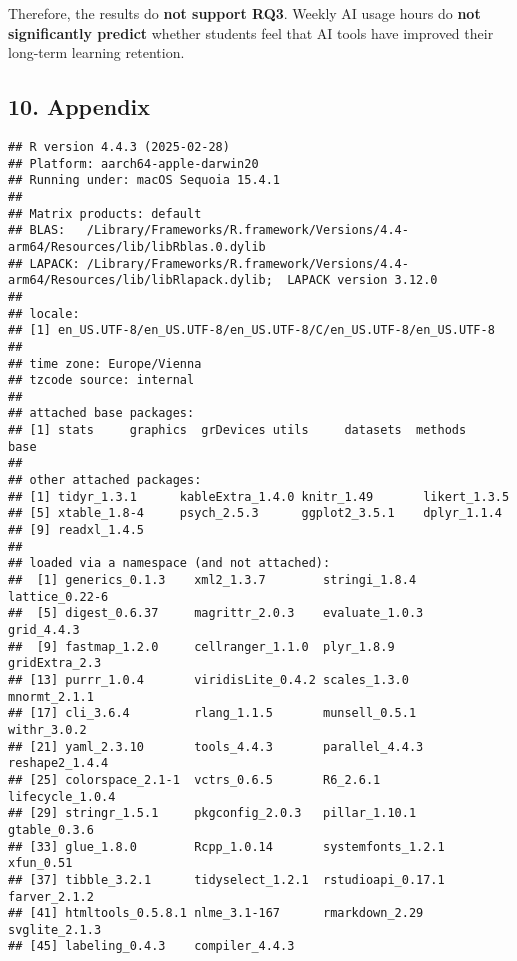 \documentclass[
]{article}
\begin{document}
Therefore, the results do \textbf{not support RQ3}. Weekly AI usage
hours do \textbf{not significantly predict} whether students feel that
AI tools have improved their long-term learning retention.

\subsection{10. Appendix}\label{appendix}

\begin{verbatim}
## R version 4.4.3 (2025-02-28)
## Platform: aarch64-apple-darwin20
## Running under: macOS Sequoia 15.4.1
## 
## Matrix products: default
## BLAS:   /Library/Frameworks/R.framework/Versions/4.4-arm64/Resources/lib/libRblas.0.dylib 
## LAPACK: /Library/Frameworks/R.framework/Versions/4.4-arm64/Resources/lib/libRlapack.dylib;  LAPACK version 3.12.0
## 
## locale:
## [1] en_US.UTF-8/en_US.UTF-8/en_US.UTF-8/C/en_US.UTF-8/en_US.UTF-8
## 
## time zone: Europe/Vienna
## tzcode source: internal
## 
## attached base packages:
## [1] stats     graphics  grDevices utils     datasets  methods   base     
## 
## other attached packages:
## [1] tidyr_1.3.1      kableExtra_1.4.0 knitr_1.49       likert_1.3.5    
## [5] xtable_1.8-4     psych_2.5.3      ggplot2_3.5.1    dplyr_1.1.4     
## [9] readxl_1.4.5    
## 
## loaded via a namespace (and not attached):
##  [1] generics_0.1.3    xml2_1.3.7        stringi_1.8.4     lattice_0.22-6   
##  [5] digest_0.6.37     magrittr_2.0.3    evaluate_1.0.3    grid_4.4.3       
##  [9] fastmap_1.2.0     cellranger_1.1.0  plyr_1.8.9        gridExtra_2.3    
## [13] purrr_1.0.4       viridisLite_0.4.2 scales_1.3.0      mnormt_2.1.1     
## [17] cli_3.6.4         rlang_1.1.5       munsell_0.5.1     withr_3.0.2      
## [21] yaml_2.3.10       tools_4.4.3       parallel_4.4.3    reshape2_1.4.4   
## [25] colorspace_2.1-1  vctrs_0.6.5       R6_2.6.1          lifecycle_1.0.4  
## [29] stringr_1.5.1     pkgconfig_2.0.3   pillar_1.10.1     gtable_0.3.6     
## [33] glue_1.8.0        Rcpp_1.0.14       systemfonts_1.2.1 xfun_0.51        
## [37] tibble_3.2.1      tidyselect_1.2.1  rstudioapi_0.17.1 farver_2.1.2     
## [41] htmltools_0.5.8.1 nlme_3.1-167      rmarkdown_2.29    svglite_2.1.3    
## [45] labeling_0.4.3    compiler_4.4.3
\end{verbatim}
\end{document}
